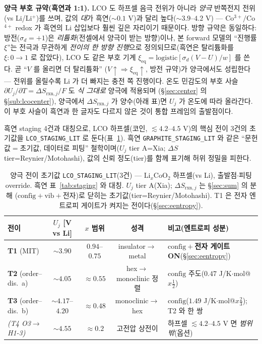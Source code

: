\documentclass[11pt,a4paper]{article}
\newcommand{\eq}{\mathrm{eq}}
\newcommand{\rxn}{\mathrm{rxn}}
\newcommand{\config}{\mathrm{config}}
\newcommand{\vib}{\mathrm{vib}}
\newcommand{\code}[1]{\texttt{#1}}
\begin{document}
\textbf{양극 부호 규약(흑연과 1:1).} LCO 도 하프셀 음극 전위가 아니라 \emph{양극} 반쪽전지 전위(vs Li/Li$^+$)를 쓰며,
값의 \emph{대}가 흑연($\sim0.1$ V)과 달리 높다($\sim3.9$--$4.2$ V) — Co$^{3+}/$Co$^{4+}$ redox 가 흑연의 Li 삽입보다
훨씬 깊은 자리이기 때문이다. 방향 규약은 동일하다: 방전($\sigma_d=+1$)은 \emph{리튬화}(전셀에서 양극이 받는 방향)이나,
본 forward 모델의 ``진행률 $\xi$''는 전극과 무관하게 \emph{전이의 한 방향 진행}으로 정의되므로(흑연은 탈리튬화를 $\xi:0\to1$
로 잡았다), LCO 도 같은 부호 기계 $\xi_\eq=\mathrm{logistic}[\sigma_d(V-U)/w]$ 를 쓴다. 곧 ``$V$ 를 올리면 더 탈리튬화''
($V\!\uparrow\Rightarrow\xi_\eq\!\uparrow$, 방전 규약)가 양극에서도 성립한다 — 전위를 올릴수록 Li 가 더 빠지는 충전 쪽
진행이다. 온도 민감도의 부호 사슬 $\partial U_j/\partial T=\Delta S_{\rxn,j}/F$ 도 \emph{식 그대로} 양극에 적용되며
(\S\ref{sec:center} 의 \S\ref{sub:lcocenter}), 양극에서 $\Delta S_{\rxn,j}$ 가 양수(아래 표)면 $U_j$ 가 온도에 따라
올라간다. 이 부호 사슬이 흑연과 한 글자도 다르지 않은 것이 통합 프레임의 출발점이다.

흑연 staging 4건과 대칭으로, LCO 하프셀(코인, $\lesssim4.2$--$4.5$ V)의 핵심 전이 3건의 초기값을 \code{LCO\_STAGING\_LIT}
로 둔다(표~\ref{tab:lcostaging}). 흑연 \code{GRAPHITE\_STAGING\_LIT} 와 같은 ``문헌값$=$초기값, 데이터로 피팅''
철학이며($U_j$ tier A=Xia; $\Delta S$ tier=Reynier\cite{reynier2004}/Motohashi\cite{motohashi2009}), 값의 신뢰 정도(tier)를
함께 표기해 허위 정밀을 피한다.

\begin{table}[t]
\centering
\renewcommand{\arraystretch}{1.3}
\caption{양극 전이 초기값 \code{LCO\_STAGING\_LIT}(3건) — $\mathrm{Li}_x\mathrm{CoO_2}$ 하프셀(vs Li), 출발점$\cdot$피팅
override. 흑연 표~\ref{tab:staging} 와 대칭. $U_j$ tier A(Xia); $\Delta S_{\rxn,j}$ 는 \S\ref{sec:sum} 의 분해
($\config+\vib+$전자)로 닫히는 초기값(tier=Reynier/Motohashi). T1 은 전자 엔트로피 게이트가 켜지는 전이다(\S\ref{sec:eentropy}).}
\label{tab:lcostaging}
\begin{tabular}{l c c c l}
\toprule
전이 & $U_j$ [V vs Li] & $x$ 범위 & 성격 & 비고(엔트로피 성분) \\
\midrule
\textbf{T1} (MIT)            & $\sim3.90$        & $0.94$--$0.75$ & insulator$\to$metal      & $\config+$\textbf{전자 게이트 ON}(\S\ref{sec:eentropy}) \\
\textbf{T2} (order--dis.\ a) & $\sim4.05$        & $\approx0.55$  & hex$\to$monoclinic 정렬   & $\config$ 주도($0.47$ J/K$\cdot$mol@$x\tfrac12$) \\
\textbf{T3} (order--dis.\ b) & $\sim4.17$--$4.20$ & $\approx0.48$  & monoclinic$\to$hex       & $\config$($1.49$ J/K$\cdot$mol@$x\tfrac23$); T2 와 한 쌍 \\
\midrule
\textit{(T4 O3$\to$H1-3)}    & $\sim4.55$        & $\approx0.2$   & 고전압 상전이             & 하프셀 $\lesssim4.2$--$4.5$ V 면 \emph{범위 밖}(옵션) \\
\bottomrule
\end{tabular}
\end{table}
\end{document}
